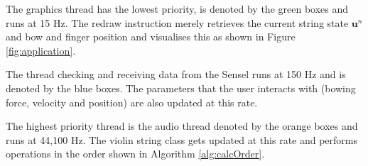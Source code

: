 \documentclass[twoside,a4paper,dvipsnames]{article}
\begin{document}
The graphics thread has the lowest priority, is denoted by the green boxes and runs at 15 Hz. The redraw instruction merely retrieves the current string state $\mathbf{u}^n$ and bow and finger position and visualises this as shown in Figure \ref{fig:application}.

The thread checking and receiving data from the Sensel runs at 150 Hz and is denoted by the blue boxes. The parameters that the user interacts with (bowing force, velocity and position) are also updated at this rate.

The highest priority thread is the audio thread denoted by the orange boxes and runs at 44,100 Hz. The violin string class gets updated at this rate and performs operations in the order shown in Algorithm \ref{alg:calcOrder}.
\end{document}
